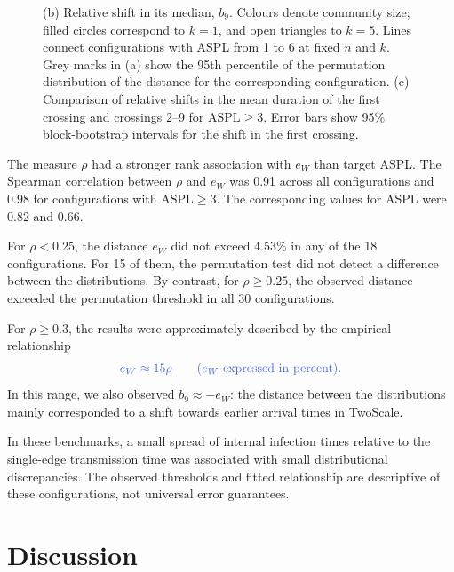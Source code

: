 \documentclass{ieeeaccess}
\newcommand{\michael}[2]{{\color{RoyalBlue}#1}}
\newcommand{\TS}{\textup{TwoScale}}
\newcommand{\eW}{e_{W}}
\begin{document}
\begin{figure}[!tbp]
{(b) Relative shift in its median, $b_9$.
Colours denote community size; filled circles correspond to $k=1$, and open triangles to $k=5$.
Lines connect configurations with ASPL from 1 to 6 at fixed $n$ and $k$. Grey marks in (a) show the 95th percentile of the permutation distribution of the distance for the corresponding configuration.
(c) Comparison of relative shifts in the mean duration of the first crossing and crossings 2--9 for $\mathrm{ASPL}\geq3$.
Error bars show 95\% block-bootstrap intervals for the shift in the first crossing.
}
\label{fig:descriptor}
\end{figure}

The measure $\rho$ had a stronger rank association with $\eW$ than target ASPL. The Spearman correlation between $\rho$ and $\eW$ was 0.91 across all configurations and 0.98 for configurations with $\mathrm{ASPL}\geq3$. The corresponding values for ASPL were 0.82 and 0.66.

For $\rho<0.25$, the distance $\eW$ \michael{did not exceed 4.53\%}{did not exceed 4.5\%} in any of the 18 configurations. For 15 of them, the permutation test did not detect a difference between the distributions. By contrast, for $\rho\geq0.25$, the observed distance exceeded the permutation threshold in all 30 configurations.

For $\rho\geq0.3$, the results were approximately described by the empirical relationship
\begin{equation}
\michael{\eW \approx 15\rho\qquad(\eW\text{ expressed in percent}).}{\eW \approx 15\rho\,\%.}
\end{equation}
In this range, we also observed $b_9\approx-\eW$: the distance between the distributions mainly corresponded to a shift towards earlier arrival times in \TS{}.

\michael{In these benchmarks, a small spread of internal infection times relative to the single-edge transmission time was associated with small distributional discrepancies. The observed thresholds and fitted relationship are descriptive of these configurations, not universal error guarantees.}{When the spread of internal infection times is small relative to the expected inter-community transmission time, aggregation of bridge nodes has a comparatively small effect on the time distributions.}

\section{Discussion}
\label{sec:discussion}
\end{document}
